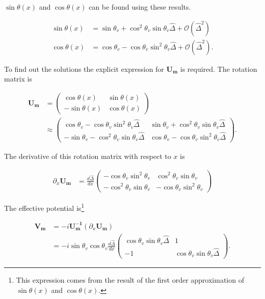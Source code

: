 \documentclass{tufte-handout}
\begin{document}
$\sin\theta(x)$ and $\cos\theta(x)$ can be found using these results.

\begin{align*}
\sin\theta(x) & = \sin \theta_v + \cos^2\theta_v \sin\theta_v \hat\Delta + \mathcal{O}(\hat\Delta^2) \\
\cos\theta(x) & = \cos\theta_v - \cos\theta_v \sin^2\theta_v \hat\Delta + \mathcal{O}(\hat\Delta^2).
\end{align*}

To find out the solutions the explicit expression for $\mathbf{U_m}$ is required. The rotation matrix is

\begin{align*}
\mathbf{U_m} &= \begin{pmatrix} \cos \theta(x) & \sin\theta(x) \\ -\sin\theta(x) & \cos\theta(x) \end{pmatrix} \\
&\approx \begin{pmatrix}
\cos\theta_v - \cos\theta_v \sin^2\theta_v \hat\Delta &  \sin \theta_v + \cos^2\theta_v \sin\theta_v \hat\Delta \\
-  \sin \theta_v - \cos^2\theta_v \sin\theta_v \hat\Delta & \cos\theta_v - \cos\theta_v \sin^2\theta_v \hat\Delta
\end{pmatrix}.
\end{align*}

The derivative of this rotation matrix with respect to $x$ is

\begin{align*}
\partial_x \mathbf{U_m} & = \frac{d \hat\Delta}{dx} \begin{pmatrix}
 - \cos\theta_v \sin^2\theta_v  &  \cos^2\theta_v \sin\theta_v  \\
 - \cos^2\theta_v \sin\theta_v  &  - \cos\theta_v \sin^2\theta_v 
\end{pmatrix}
\end{align*}


The effective potential is\footnote{This expression comes from the result of the first order approximation of $\sin\theta(x)$ and $\cos\theta(x)$.}

\begin{align*}
\mathbf{V_m} & = -i\mathbf{U_m^{-1}} ( \partial_x \mathbf{U_m} ) \\
& = - i\sin\theta_v \cos\theta_v \frac{d\hat\Delta}{dx} \begin{pmatrix}
\cos\theta_v\sin\theta_v \hat \Delta & 1 \\
-1 & \cos\theta_v \sin\theta_v \hat\Delta 
\end{pmatrix} .
\end{align*}
\end{document}
